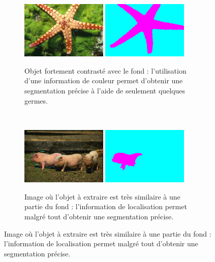 \begin{figure}[htb]
	\centering	
	 \begin{subfigure}[B]{\textwidth}
	 \centering
			\includegraphics[width=0.45\textwidth]{images/evaluation/McGuinness/12003_seeds.jpg}
			\includegraphics[width=0.45\textwidth]{images/evaluation/McGuinness/12003_seg.png}
		 \caption{Objet fortement contrasté avec le fond : l'utilisation d'une information de couleur permet d'obtenir une segmentation précise à l'aide de seulement quelques germes.}
	\end{subfigure}		
	\\	
	 \begin{subfigure}[B]{\textwidth}	
	 \centering
			\includegraphics[width=0.45\textwidth]{images/evaluation/McGuinness/66053_seeds.jpg}
			\includegraphics[width=0.45\textwidth]{images/evaluation/McGuinness/66053_seg.png}
		 \caption{Image où l'objet à extraire est très similaire à une partie du fond : l'information de localisation permet malgré tout d'obtenir une segmentation précise.}

\end{subfigure}
\end{figure}
